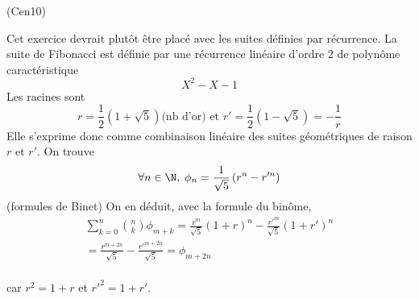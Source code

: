 \begin{tiny}(Cen10)\end{tiny} Cet exercice devrait plutôt être placé avec les suites définies par récurrence.\newline
La suite de Fibonacci est définie par une récurrence linéaire d'ordre $2$ de polynôme caractéristique 
\begin{displaymath}
  X^2 - X - 1
\end{displaymath}
Les racines sont
\begin{displaymath}
  r = \frac{1}{2}\left(1+\sqrt{5}\right) \text{(nb d'or) et } r' = \frac{1}{2}\left(1-\sqrt{5}\right) = -\frac{1}{r} 
\end{displaymath}
Elle s'exprime donc comme combinaison linéaire des suites géométriques de raison $r$ et $r'$. On trouve
\begin{displaymath}
\forall n\in \N,\; \phi_n = \frac{1}{\sqrt{5}}\left( r^n - r'^n\right)   
\end{displaymath}
(formules de Binet) On en déduit, avec la formule du binôme, 
\begin{multline*}
\sum_{k=0}^n\binom{n}{k}\phi_{m+k} = \frac{r^m}{\sqrt{5}}(1+r)^n - \frac{r'^m}{\sqrt{5}}(1+r')^n \\
= \frac{r^{m+2n}}{\sqrt{5}} - \frac{r'^{m+2n}}{\sqrt{5}} = \phi_{m+2n}\\
\end{multline*}

car $r^2 = 1+r$ et $r'^2 = 1 + r'$.
